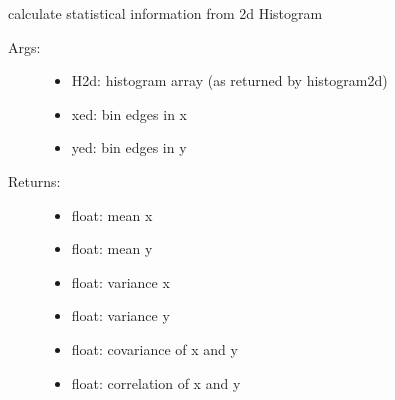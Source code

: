 \documentclass[letterpaper,10pt,english]{sphinxmanual}
\begin{document}
\begin{fulllineitems}
\label{\detokenize{index:PhyPraKit.PhyPraKit.hist2dstat}}
calculate statistical information from 2d Histogram
\begin{description}
\item[{Args:}] \leavevmode\begin{itemize}
\item {} 
H2d: histogram array (as returned by histogram2d)

\item {} 
xed: bin edges in x

\item {} 
yed: bin edges in y

\end{itemize}

\item[{Returns:}] \leavevmode\begin{itemize}
\item {} 
float: mean x

\item {} 
float: mean y

\item {} 
float: variance x

\item {} 
float: variance y

\item {} 
float: covariance of x and y

\item {} 
float: correlation of x and y

\end{itemize}

\end{description}

\end{fulllineitems}

\end{document}
